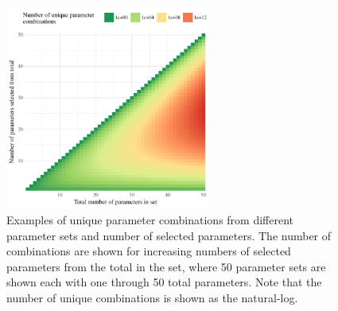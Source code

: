 \documentclass[preprint]{elsarticle}\usepackage[]{graphicx}\usepackage[]{color}
\begin{document}
\begin{figure}[!ht]

{\centering \includegraphics[width=0.6\textwidth]{figs/combnex-1} 

}

\caption[Examples of unique parameter combinations from different parameter sets and number of selected parameters]{Examples of unique parameter combinations from different parameter sets and number of selected parameters.  The number of combinations are shown for increasing numbers of selected parameters from the total in the set, where 50 parameter sets are shown each with one through 50 total parameters. Note that the number of unique combinations is shown as the natural-log.}\label{fig:combnex}
\end{figure}
\end{document}
